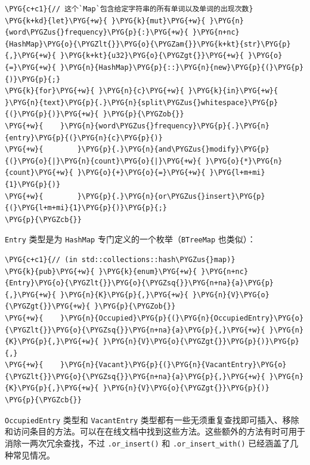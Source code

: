 \begin{Verbatim}[commandchars=\\\{\},breaklines=true,breakanywhere=true,fontsize=\codefont,xleftmargin=17bp]
\PYG{c+c1}{// 这个`Map`包含给定字符串的所有单词以及单词的出现次数}
\PYG{k+kd}{let}\PYG{+w}{ }\PYG{k}{mut}\PYG{+w}{ }\PYG{n}{word\PYGZus{}frequency}\PYG{p}{:}\PYG{+w}{ }\PYG{n+nc}{HashMap}\PYG{o}{\PYGZlt{}}\PYG{o}{\PYGZam{}}\PYG{k+kt}{str}\PYG{p}{,}\PYG{+w}{ }\PYG{k+kt}{u32}\PYG{o}{\PYGZgt{}}\PYG{+w}{ }\PYG{o}{=}\PYG{+w}{ }\PYG{n}{HashMap}\PYG{p}{::}\PYG{n}{new}\PYG{p}{(}\PYG{p}{)}\PYG{p}{;}
\PYG{k}{for}\PYG{+w}{ }\PYG{n}{c}\PYG{+w}{ }\PYG{k}{in}\PYG{+w}{ }\PYG{n}{text}\PYG{p}{.}\PYG{n}{split\PYGZus{}whitespace}\PYG{p}{(}\PYG{p}{)}\PYG{+w}{ }\PYG{p}{\PYGZob{}}
\PYG{+w}{    }\PYG{n}{word\PYGZus{}frequency}\PYG{p}{.}\PYG{n}{entry}\PYG{p}{(}\PYG{n}{c}\PYG{p}{)}
\PYG{+w}{        }\PYG{p}{.}\PYG{n}{and\PYGZus{}modify}\PYG{p}{(}\PYG{o}{|}\PYG{n}{count}\PYG{o}{|}\PYG{+w}{ }\PYG{o}{*}\PYG{n}{count}\PYG{+w}{ }\PYG{o}{+}\PYG{o}{=}\PYG{+w}{ }\PYG{l+m+mi}{1}\PYG{p}{)}
\PYG{+w}{        }\PYG{p}{.}\PYG{n}{or\PYGZus{}insert}\PYG{p}{(}\PYG{l+m+mi}{1}\PYG{p}{)}\PYG{p}{;}
\PYG{p}{\PYGZcb{}}
\end{Verbatim}

\texttt{Entry} 类型是为 \texttt{HashMap} 专门定义的一个枚举（\texttt{BTreeMap} 也类似）：

\begin{Verbatim}[commandchars=\\\{\},breaklines=true,breakanywhere=true,fontsize=\codefont,xleftmargin=17bp]
\PYG{c+c1}{// (in std::collections::hash\PYGZus{}map)}
\PYG{k}{pub}\PYG{+w}{ }\PYG{k}{enum}\PYG{+w}{ }\PYG{n+nc}{Entry}\PYG{o}{\PYGZlt{}}\PYG{o}{\PYGZsq{}}\PYG{n+na}{a}\PYG{p}{,}\PYG{+w}{ }\PYG{n}{K}\PYG{p}{,}\PYG{+w}{ }\PYG{n}{V}\PYG{o}{\PYGZgt{}}\PYG{+w}{ }\PYG{p}{\PYGZob{}}
\PYG{+w}{    }\PYG{n}{Occupied}\PYG{p}{(}\PYG{n}{OccupiedEntry}\PYG{o}{\PYGZlt{}}\PYG{o}{\PYGZsq{}}\PYG{n+na}{a}\PYG{p}{,}\PYG{+w}{ }\PYG{n}{K}\PYG{p}{,}\PYG{+w}{ }\PYG{n}{V}\PYG{o}{\PYGZgt{}}\PYG{p}{)}\PYG{p}{,}
\PYG{+w}{    }\PYG{n}{Vacant}\PYG{p}{(}\PYG{n}{VacantEntry}\PYG{o}{\PYGZlt{}}\PYG{o}{\PYGZsq{}}\PYG{n+na}{a}\PYG{p}{,}\PYG{+w}{ }\PYG{n}{K}\PYG{p}{,}\PYG{+w}{ }\PYG{n}{V}\PYG{o}{\PYGZgt{}}\PYG{p}{)}
\PYG{p}{\PYGZcb{}}
\end{Verbatim}

\texttt{OccupiedEntry} 类型和 \texttt{VacantEntry} 类型都有一些无须重复查找即可插入、移除和访问条目的方法。可以在在线文档中找到这些方法。这些额外的方法有时可用于消除一两次冗余查找，不过 \texttt{.or\_insert()} 和 \texttt{.or\_insert\_with()} 已经涵盖了几种常见情况。

